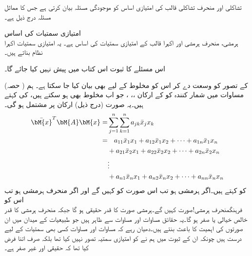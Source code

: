 تشاکلی اور منحرف تشاکلی قالب کی امتیازی اساس کو موجودگی مسئلہ   بیان کرتی ہے جس کا مماثل مسئلہ درج ذیل ہے۔

\quad امتیازی سمتیات کی اساس\\
ہرمشی، منحرف ہرمشی اور اکہرا قالب کے امتیازی سمتیات  کی اساس  ہے۔   یہ امتیازی سمتیات اکہرا نظام بناتے ہیں۔

اس مسئلے کا ثبوت اس کتاب میں پیش نہیں کیا جائے گا۔

 (حصہ ) کے تصور کو وسعت دے کر اس کو مخلوط کے لیے بھی بیان کیا جا سکتا ہے۔ ہم مساوات  میں شمار کنندہ 
 کو  کے ارکان ،، ، جو اب مخلوط بھی ہو سکتے ہیں، کی 
 کہتے ہیں۔یہ صورت (درج ذیل)  ارکان پر مشتمل ہو گی۔
\begin{gather}
\begin{aligned}\label{مساوات_امتیازی_ہرمشی_صورت_وغیرہ}
\bar{\bM{x}}^T\bM{A}\bM{x}=&\sum_{j=1}^{n}\sum_{k=1}^{n} a_{jk}\bar{x}_jx_k\\
=&\phantom{+\,}a_{11}\bar{x}_1x_1+a_{12}\bar{x}_1x_2+\cdots+a_{1n}\bar{x}_1x_n\\
&+a_{21}\bar{x}_2x_1+a_{22}\bar{x}_2x_2+\cdots+a_{2n}\bar{x}_2x_n\\
&\vdots\\
&+a_{n1}\bar{x}_n x_1+a_{n2}\bar{x}_n x_2+\cdots+a_{nn}\bar{x}_nx_n
\end{aligned}
\end{gather}
 کو  کہتے ہیں۔اگر  ہرمشی ہو تب اس صورت کو  کہیں گے اور اگر  منحرف ہرمشی ہو تب اس کو \\فرہنگ{منحرف ہرمشی!صورت} کہیں گے۔ہرمشی صورت کا قدر حقیقی ہو گا جبکہ منحرف ہرمشی کا قدر خالص خیالی یا صفر  ہو گا۔یہ حقائق مساوات  اور مساوات  سے ظاہر ہیں جو طبیعیات کے میدان میں ان صورتوں کی اہمیت کا باعث بنتے ہیں۔دھیان رہے کہ مساوات  اور مساوات  کسی بھی سمتیات کے لیے درست ہیں چونکہ ان کے ثبوت میں ہم نے  کو امتیازی سمتیہ تصور نہیں کیا تھا بلکہ صرف اتنا فرض کیا تھا کہ  حقیقی اور غیر صفر ہے۔

